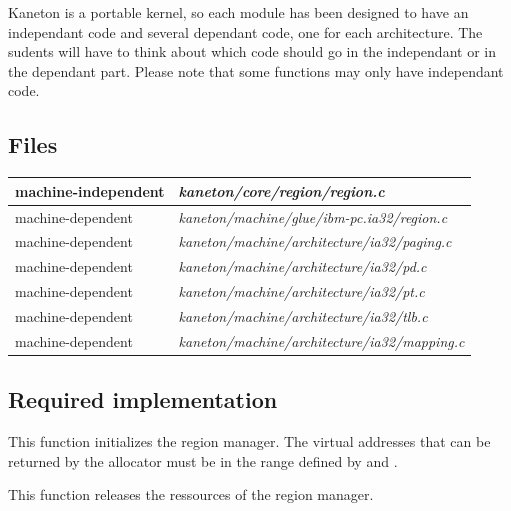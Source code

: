 Kaneton is a portable kernel, so each module has been designed to have an independant code and several dependant code, one for each architecture. The sudents will have to think about which code should go in the independant or in the dependant part. Please note that some functions may only have independant code.

\subsection*{Files}

\begin{tabular}{| l | l |}
  \hline
  machine-independent & {\em kaneton/core/region/region.c}\\\hline
  machine-dependent & {\em kaneton/machine/glue/ibm-pc.ia32/region.c}\\\hline
  machine-dependent & {\em kaneton/machine/architecture/ia32/paging.c}\\\hline
  machine-dependent & {\em kaneton/machine/architecture/ia32/pd.c}\\\hline
  machine-dependent & {\em kaneton/machine/architecture/ia32/pt.c}\\\hline
  machine-dependent & {\em kaneton/machine/architecture/ia32/tlb.c}\\\hline
  machine-dependent & {\em kaneton/machine/architecture/ia32/mapping.c}\\\hline
\end{tabular}

\subsection*{Required implementation}

{
  This function initializes the region manager. The virtual addresses that can
  be returned by the allocator must be in the range defined by 
  and .
}

{
  This function releases the ressources of the region manager.
}

